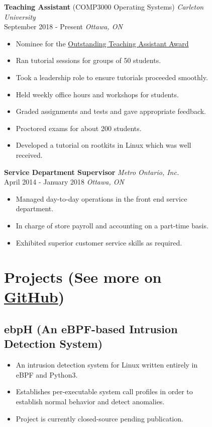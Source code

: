 \documentclass[]{article}
\theoremstyle{plain}
\theoremstyle{remark}
\theoremstyle{definition}
\begin{document}
\begin{figure}
\begin{minipage}[t]{0.65\textwidth}
\color{black}
\textbf{Teaching Assistant} (COMP3000 Operating Systems) \hfill \emph{Carleton University}\\
September 2018 - Present \hfill\emph {Ottawa, ON}
\color{gray}
\begin{itemize}[itemsep=0em]
\item Nominee for the \href{https://carleton.ca/tasupport/taawards/edc-outstanding-ta-awards/}{Outstanding Teaching Assistant Award}
\item Ran tutorial sessions for groups of 50 students.
\item Took a leadership role to ensure tutorials proceeded smoothly.
\item Held weekly office hours and workshops for students.
\item Graded assignments and tests and gave appropriate feedback.
\item Proctored exams for about 200 students.
\item Developed a tutorial on rootkits in Linux which was well received.
\end{itemize}

\color{black}
\textbf{Service Department Supervisor} \hfill \emph{Metro Ontario, Inc.}\\
April 2014 - January 2018 \hfill\emph {Ottawa, ON}
\color{gray}
\begin{itemize}[itemsep=0em]
\item Managed day-to-day operations in the front end service department.
\item In charge of store payroll and accounting on a part-time basis.
\item Exhibited superior customer service skills as required.
\end{itemize}

\section{Projects \normalfont \small (See more on \href{https://www.github.com/willfindlay}{GitHub})}

\subsection{ebpH (An eBPF-based Intrusion Detection System)}
\begin{itemize}[itemsep=0em]
\item An intrusion detection system for Linux written entirely in eBPF and Python3.
\item Establishes per-executable system call profiles in order to establish normal behavior and detect anomalies.
\item Project is currently closed-source pending publication.
\end{itemize}


\end{minipage}
\end{figure}
\end{document}
